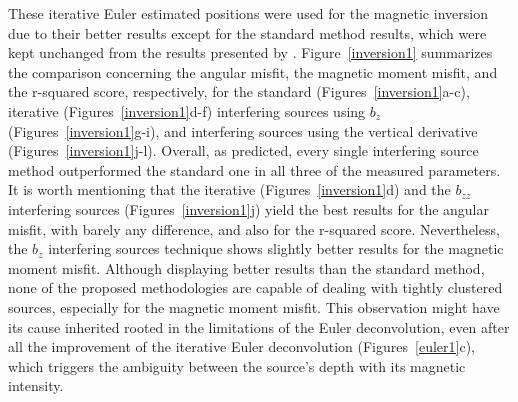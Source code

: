 These iterative Euler estimated positions were used for the magnetic inversion due to their better results except for the standard method results, which were kept unchanged from the results presented by \citet{Souza-Junior2023b}. Figure~\ref{inversion1} summarizes the comparison concerning the angular misfit, the magnetic moment misfit, and the r-squared score, respectively, for the standard (Figures~\ref{inversion1}a-c), iterative (Figures~\ref{inversion1}d-f) interfering sources using $b_z$ (Figures~\ref{inversion1}g-i), and interfering sources using the vertical derivative (Figures~\ref{inversion1}j-l). Overall, as predicted, every single interfering source method outperformed the standard one in all three of the measured parameters. It is worth mentioning that the iterative (Figures~\ref{inversion1}d) and the $b_{zz}$ interfering sources (Figures~\ref{inversion1}j) yield the best results for the angular misfit, with barely any difference, and also for the r-squared score. Nevertheless, the $b_{z}$ interfering sources technique shows slightly better results for the magnetic moment misfit. Although displaying better results than the standard method, none of the proposed methodologies are capable of dealing with tightly clustered sources, especially for the magnetic moment misfit. This observation might have its cause inherited rooted in the limitations of the Euler deconvolution, even after all the improvement of the iterative Euler deconvolution (Figures~\ref{euler1}c), which triggers the ambiguity between the source's depth with its magnetic intensity.



